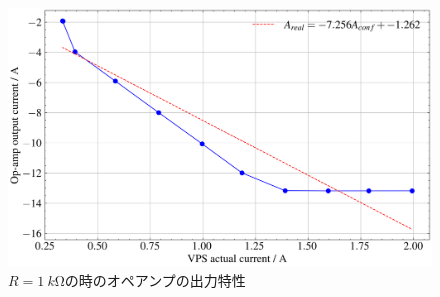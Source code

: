 \begin{figure}[!htb]
    \centering
    \includegraphics[width=0.6\linewidth]{src/figures/consi3/1k-vps-op-amp-with-fit.png}
    \caption{$R=\SI{1}{k\ohm}$の時のオペアンプの出力特性}\label{fig:1k-vps-op-amp-with-fit}
\end{figure}
